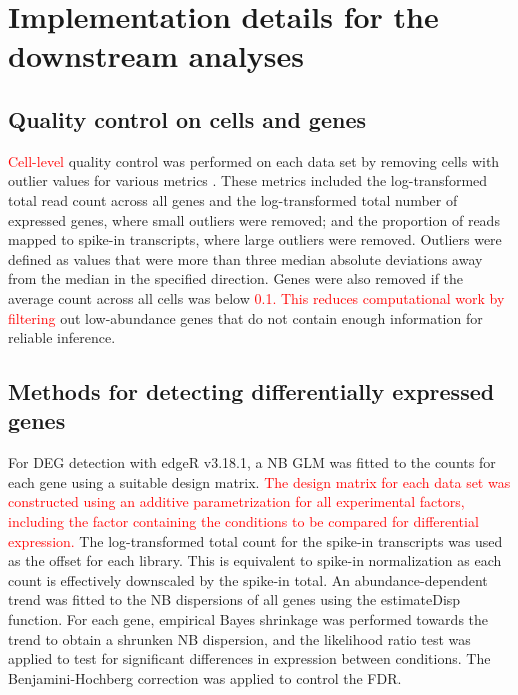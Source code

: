 \documentclass{article}
\newcommand\revised[1]{\textcolor{red}{#1}}
\begin{document}
\section{Implementation details for the downstream analyses}

\subsection{Quality control on cells and genes}
\revised{Cell-level} quality control was performed on each data set by removing cells with outlier values for various metrics \citep{lun2016stepbystep}.
These metrics included the log-transformed total read count across all genes and the log-transformed total number of expressed genes, where small outliers were removed; 
and the proportion of reads mapped to spike-in transcripts, where large outliers were removed.
Outliers were defined as values that were more than three median absolute deviations away from the median in the specified direction.
Genes were also removed if the average count across all cells was below \revised{0.1.
This reduces computational work by filtering} out low-abundance genes that do not contain enough information for reliable inference.

\subsection{Methods for detecting differentially expressed genes}
For DEG detection with edgeR v3.18.1, a NB GLM was fitted to the counts for each gene \citep{mccarthy2012differential} using a suitable design matrix.
\revised{The design matrix for each data set was constructed using an additive parametrization for all experimental factors, including the factor containing the conditions to be compared for differential expression.}
The log-transformed total count for the spike-in transcripts was used as the offset for each library.
This is equivalent to spike-in normalization as each count is effectively downscaled by the spike-in total.
An abundance-dependent trend was fitted to the NB dispersions of all genes using the estimateDisp function.
For each gene, empirical Bayes shrinkage was performed towards the trend to obtain a shrunken NB dispersion, and the likelihood ratio test was applied to test for significant differences in expression between conditions.
The Benjamini-Hochberg correction was applied to control the FDR.
\end{document}
